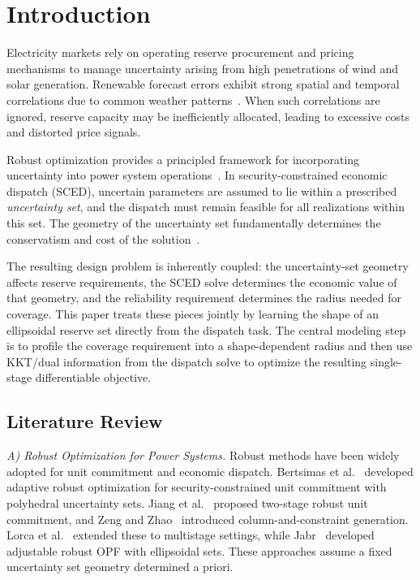 \documentclass[11pt]{article}
\theoremstyle{definition}
\begin{document}
\section{Introduction}
\label{sec:introduction}

Electricity markets rely on operating reserve procurement and pricing mechanisms to manage uncertainty arising from high penetrations of wind and solar generation. Renewable forecast errors exhibit strong spatial and temporal correlations due to common weather patterns~\citep{hodge2011wind,pinson2013wind}. When such correlations are ignored, reserve capacity may be inefficiently allocated, leading to excessive costs and distorted price signals.

Robust optimization provides a principled framework for incorporating uncertainty into power system operations~\citep{ben2009robust,bertsimas2011theory}. In security-constrained economic dispatch (SCED), uncertain parameters are assumed to lie within a prescribed \emph{uncertainty set}, and the dispatch must remain feasible for all realizations within this set. The geometry of the uncertainty set fundamentally determines the conservatism and cost of the solution~\citep{bertsimas2013adaptive}.

The resulting design problem is inherently coupled: the uncertainty-set geometry affects reserve requirements, the SCED solve determines the economic value of that geometry, and the reliability requirement determines the radius needed for coverage. This paper treats these pieces jointly by learning the shape of an ellipsoidal reserve set directly from the dispatch task. The central modeling step is to profile the coverage requirement into a shape-dependent radius and then use KKT/dual information from the dispatch solve to optimize the resulting single-stage differentiable objective.

\subsection{Literature Review}

\emph{A) Robust Optimization for Power Systems.}
Robust methods have been widely adopted for unit commitment and economic dispatch. Bertsimas et al.~\citep{bertsimas2013adaptive} developed adaptive robust optimization for security-constrained unit commitment with polyhedral uncertainty sets. Jiang et al.~\citep{jiang2012robust} proposed two-stage robust unit commitment, and Zeng and Zhao~\citep{zeng2013solving} introduced column-and-constraint generation. Lorca et al.~\citep{lorca2016multistage} extended these to multistage settings, while Jabr~\citep{jabr2013adjustable} developed adjustable robust OPF with ellipsoidal sets. These approaches assume a fixed uncertainty set geometry determined a priori.
\end{document}

